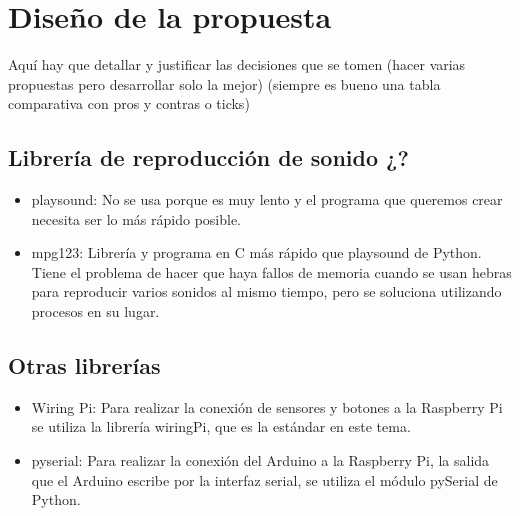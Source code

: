 
\chapter{Diseño de la propuesta} %
\label{cha:Diseno}

    Aquí hay que detallar y justificar las decisiones que se tomen (hacer varias propuestas pero desarrollar solo la
    mejor) (siempre es bueno una tabla comparativa con pros y contras o ticks)

    \section{Librería de reproducción de sonido ¿?} %
    \label{sec:LibreriaDeReproduccionDeSonido}

        \begin{itemize}
            \item
            playsound\cite{playsound}: No se usa porque es muy lento y el programa que queremos crear necesita ser lo
            más rápido posible.
            \item
            mpg123\cite{mpg123}: Librería y programa en C más rápido que playsound de Python. Tiene el problema de
            hacer que haya fallos de memoria cuando se usan hebras para reproducir varios sonidos al mismo tiempo, pero
            se soluciona utilizando procesos en su lugar.
        \end{itemize}


    \section{Otras librerías} %
    \label{sec:OtrasLibrerias}

        \begin{itemize}
            \item
            Wiring Pi\cite{wiringPi}: Para realizar la conexión de sensores y botones a la Raspberry Pi se utiliza
            la librería wiringPi, que es la estándar en este tema.
            \item
            pyserial\cite{pyserial}: Para realizar la conexión del Arduino a la Raspberry Pi, la salida que el Arduino
            escribe por la interfaz serial, se utiliza el módulo pySerial de Python.
        \end{itemize}

